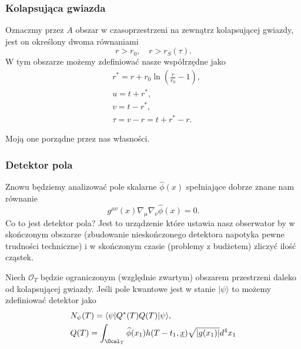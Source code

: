 \documentclass[10pt,t]{beamer}
\begin{document}
\begin{frame}
  \frametitle{Kolapsująca gwiazda}


  Oznaczmy przez $A$ obszar w czasoprzestrzeni na zewnątrz
  kolapsującej gwiazdy, jest on określony dwoma równaniami
  \begin{equation}
    \label{eq:Promieniowanie-Hawkinga-21}
    r > r_{ 0 }, \quad
    r > r_{ S }( \tau ).
  \end{equation}
  W tym obszarze możemy zdefiniować nasze współrzędne jako
  \begin{subequations}
    \begin{align}
      \label{eq:Promieniowanie-Hawkinga-22-A}
      &r^{ * } = r + r_{ 0 } \ln( \frac{ r }{ r_{ 0 } } - 1 ), \\
      \label{eq:Promieniowanie-Hawkinga-22-B}
      &u = t + r^{ * }, \\
      \label{eq:Promieniowanie-Hawkinga-22-C}
      &v = t - r^{ * }, \\
      \label{eq:Promieniowanie-Hawkinga-22-D}
      &\tau = v - r = t + r^{ * } - r.
    \end{align}
  \end{subequations}

  Moją one porządne przez nas własności.

\end{frame}





\begin{frame}
  \frametitle{Detektor pola}


  Znowu będziemy analizować pole skalarne $\widehat{\phi}( x )$
  spełniające dobrze znane nam równanie
  \begin{equation}
    \label{eq:Promieniowanie-Hawkinga-23}
    g^{ \mu \nu }( x ) \nabla_{ \mu } \nabla_{ \nu } \widehat{\phi}( x ) = 0.
  \end{equation}
  Co to jest detektor pola? Jest to urządzenie które ustawia nasz
  obserwator by w skończonym obszarze (zbudowanie nieskończonego
  detektora napotyka pewne trudności techniczne) i w skończonym czasie
  (problemy z budżetem) zliczyć ilość cząstek.

  Niech $\mathcal{O}_{ T }$ będzie ograniczonym (względnie zwartym)
  obszarem przestrzeni daleko od kolapsującej gwiazdy. Jeśli pole
  kwantowe jest w stanie $| \psi \rangle$ to możemy zdefiniować detektor jako
  \begin{subequations}
    \begin{align}
      \label{eq:Promieniowanie-Hawkinga-24-A}
      &N_{ \psi }( T ) = \langle \psi | Q^{ * }( T ) Q( T )  | \psi \rangle, \\
      \label{eq:Promieniowanie-Hawkinga-24-B}
      &Q( T ) = \int_{ \Ocal_{ T } } \widehat{\phi}( x_{ 1 } )
        h( T - t_{ 1 }, \underline{x} ) \sqrt{ | g( x_{ 1 } ) | }
        d^{ 4 }x_{ 1 }
    \end{align}
  \end{subequations}

\end{frame}
\end{document}
